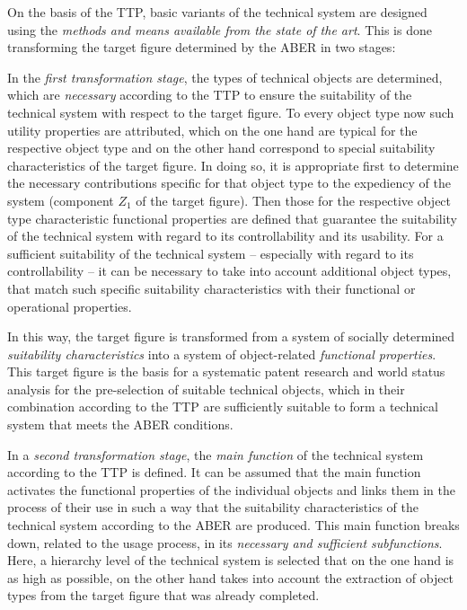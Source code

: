 \documentclass[11pt,a4paper]{article}
\begin{document}
On the basis of the TTP, basic variants of the technical system are designed
using the \emph{methods and means available from the state of the art}.  This
is done transforming the target figure determined by the ABER in two stages:

In the \emph{first transformation stage}, the types of technical objects are
determined, which are \emph{necessary} according to the TTP to ensure the
suitability of the technical system with respect to the target figure.  To
every object type now such utility properties are attributed, which on the one
hand are typical for the respective object type and on the other hand
correspond to special suitability characteristics of the target figure. In
doing so, it is appropriate first to determine the necessary contributions
specific for that object type to the expediency of the system (component $Z_1$
of the target figure). Then those for the respective object type
characteristic functional properties are defined that guarantee the
suitability of the technical system with regard to its controllability and its
usability. For a sufficient suitability of the technical system -- especially
with regard to its controllability -- it can be necessary to take into account
additional object types, that match such specific suitability characteristics
with their functional or operational properties.

In this way, the target figure is transformed from a system of socially
determined \emph{suitability characteristics} into a system of object-related
\emph{functional properties}. This target figure is the basis for a systematic
patent research and world status analysis for the pre-selection of suitable
technical objects, which in their combination according to the TTP are
sufficiently suitable to form a technical system that meets the ABER
conditions.

In a \emph{second transformation stage}, the \emph{main function} of the
technical system according to the TTP is defined. It can be assumed that the
main function activates the functional properties of the individual objects
and links them in the process of their use in such a way that the suitability
characteristics of the technical system according to the ABER are produced.
This main function breaks down, related to the usage process, in its
\emph{necessary and sufficient subfunctions}. Here, a hierarchy level of the
technical system is selected that on the one hand is as high as possible, on
the other hand takes into account the extraction of object types from the
target figure that was already completed.
\end{document}
